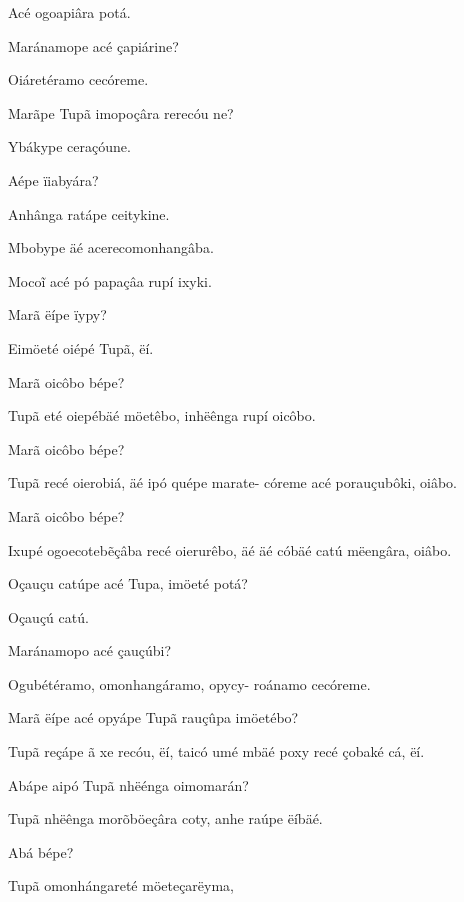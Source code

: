 \documentclass[openany,titlepage,12pt]{book}
\begin{document}
\begin{altereven}
    \item Acé ogoapiâra potá.
    \item Maránamope acé çapiárine?
    \item Oiáretéramo cecóreme.
    \item Marãpe Tupã imopoçâra rerecóu ne?
    \item Ybákype ceraçóune.
    \item Aépe ïiabyára?
    \item Anhânga ratápe ceitykine.
    \item Mbobype äé acerecomonhangâba.
    \item Moco\~i acé pó papaçâa rupí ixyki.
    \item Marã ëípe ïypy?
    \item Eimöeté oiépé Tupã, ëí.
    \item Marã oicôbo bépe?
    \item Tupã eté oiepébäé möetêbo, inhëênga\linebreak
        rupí oicôbo.
    \item Marã oicôbo bépe?
    \item Tupã recé oierobiá, äé ipó quépe marate-
        córeme acé porauçubôki, oiâbo.
    \item Marã oicôbo bépe?
    \item Ixupé ogoecoteb\~eçâba recé oierurêbo,\linebreak
        äé äé cóbäé catú mëengâra, oiâbo.
    \item Oçauçu catúpe acé Tupa, imöeté potá?
    \item Oçauçú catú.
    \item Maránamopo acé çauçúbi?
    \item Ogubétéramo, omonhangáramo, opycy-
        roánamo cecóreme.
    \item Marã ëípe acé opyápe Tupã rauçûpa\linebreak
        imöetébo?
    \item Tupã reçápe ã xe recóu, ëí, taicó umé\linebreak
    \newpage
        mbäé poxy recé çobaké cá, ëí.
    \item Abápe aipó Tupã nhëénga oimomarán?
    \item Tupã nhëênga morõböeçâra coty, anhe
        raúpe ëíbäé.
    \item Abá bépe?
    \item Tupã omonhángareté möeteçarëyma,\linebreak

\end{altereven}
\end{document}

